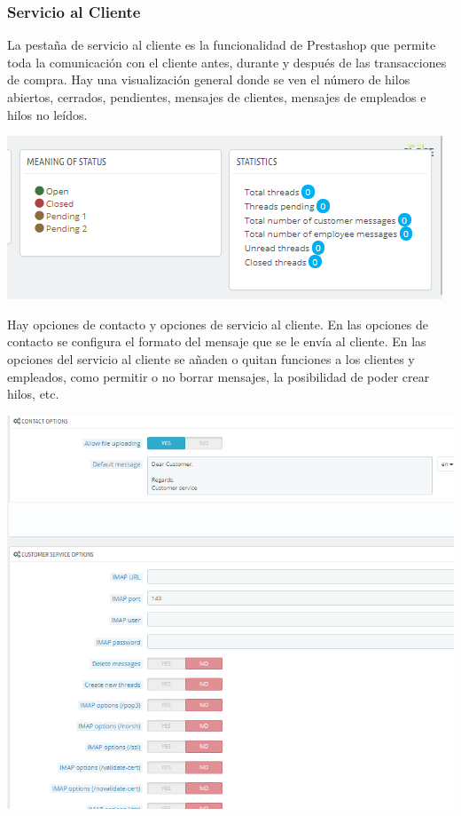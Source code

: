\documentclass{article}
\begin{document}
\subsubsection{Servicio al Cliente}

La pestaña de servicio al cliente es la funcionalidad de Prestashop que permite toda la comunicación con el cliente antes, durante y después de las transacciones de compra. Hay una visualización general donde se ven el número de hilos abiertos, cerrados, pendientes, mensajes de clientes, mensajes de empleados e hilos no leídos.

\begin{center}
\includegraphics[scale=0.6]{images/cuse.png}
\end{center}

Hay opciones de contacto y opciones de servicio al cliente. En las opciones de contacto se configura el formato del mensaje que se le envía al cliente. En las opciones del servicio al cliente se añaden o quitan funciones a los clientes y empleados, como permitir o no borrar mensajes, la posibilidad de poder crear hilos, etc.

\begin{center}
\includegraphics[scale=0.4]{images/opciones.png}
\end{center}
\end{document}
